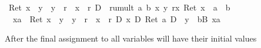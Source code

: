 \begin{isabellebody}
\begin{isamarkuptxt}
      \begin{isabelle}%
{\isasymturnstile}\ Ret\ {\isacharparenleft}x\ {\isasymnoteq}\ y\ {\isasymand}\ y\ {\isasymnoteq}\ r\ {\isasymand}\ x\ {\isasymnoteq}\ r{\isacharparenright}\ {\isasymlongrightarrow}\isactrlsub D\ {\isacharbrackleft}{\isacharhash}\ rumult\ a\ b\ x\ y\ r{\isacharbrackright}{\isacharparenleft}{\isasymlambda}x{\isachardot}\ Ret\ {\isacharparenleft}x\ {\isacharequal}\ a\ {\isacharasterisk}\ b{\isacharparenright}{\isacharparenright}\isanewline
\ {}{\isachardot}\ {\isasymAnd}xa{\isachardot}\ {\isasymturnstile}\ Ret\ {\isacharparenleft}x\ {\isasymnoteq}\ y\ {\isasymand}\ y\ {\isasymnoteq}\ r\ {\isasymand}\ x\ {\isasymnoteq}\ r{\isacharparenright}\ {\isasymand}\isactrlsub D\ {\isacharasterisk}x\ {\isacharequal}\isactrlsub D\ Ret\ a\ {\isasymlongrightarrow}\isactrlsub D\ {\isacharbrackleft}{\isacharhash}\ y\ {\isacharcolon}{\isacharequal}\ b{\isacharbrackright}{\isacharquery}B{}\ xa%
\end{isabelle}%
\end{isamarkuptxt}%
\isamarkuptrue%
\isamarkupfalse%
\isamarkupfalse%
\isamarkupfalse%
\isamarkupfalse%
\isamarkupfalse%
\isamarkupfalse%
\isamarkupfalse%
\isamarkupfalse%
\isamarkupfalse%
\isamarkupfalse%
\isamarkupfalse%
\isamarkupfalse%
\isamarkupfalse%
\isamarkupfalse%
%
\begin{isamarkuptxt}%
After the final assignment to  all variables will have their initial values


\end{isamarkuptxt}
\end{isabellebody}
